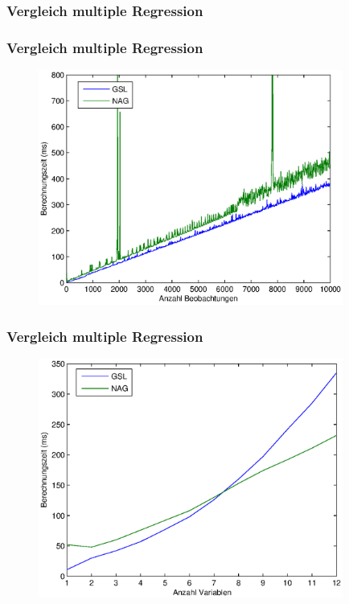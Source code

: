 \documentclass{beamer}
\begin{document}
\begin{frame}
  \frametitle{Vergleich multiple Regression}
  
  \begin{block}{}
    
  \end{block}
  
  \begin{block}{}
    
  \end{block}

\end{frame}

\begin{frame}
  \frametitle{Vergleich multiple Regression}

  \begin{figure}[t]
    \centering
    \includegraphics[width=10cm]{figures/multi_reg_comp_6_var.eps}
  \end{figure}

\end{frame}

\begin{frame}
  \frametitle{Vergleich multiple Regression}

  \begin{figure}[t]
    \centering
    \includegraphics[width=10cm]{figures/multi_reg_vars_2500_obs.eps}
  \end{figure}
\end{frame}
\end{document}
